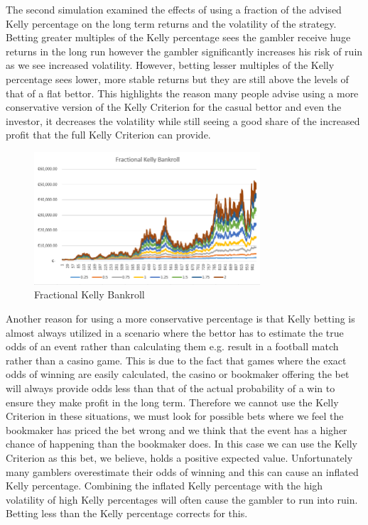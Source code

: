 \documentclass[12pt]{article}
\begin{document}
The second simulation examined the effects of using a fraction of the advised Kelly percentage on the long term returns and the volatility of the strategy. Betting greater multiples of the Kelly percentage sees the gambler receive huge returns in the long run however the gambler significantly increases his risk of ruin as we see increased volatility. However, betting lesser multiples of the Kelly percentage sees lower, more stable returns but they are still above the levels of that of a flat bettor. This highlights the reason many people advise using a more conservative version of the Kelly Criterion for the casual bettor and even the investor, it decreases the volatility while still seeing a good share of the increased profit that the full Kelly Criterion can provide.\cite{thorp}

\begin{figure}[H]
\centering
\includegraphics[width=0.75\textwidth]{frac_kelly.PNG}
\caption{Fractional Kelly Bankroll}
\end{figure}

Another reason for using a more conservative percentage is that Kelly betting is almost always utilized in a scenario where the bettor has to estimate the true odds of an event rather than calculating them e.g. result in a football match rather than a casino game. This is due to the fact that games where the exact odds of winning are easily calculated, the casino or bookmaker offering the bet will always provide odds less than that of the actual probability of a win to ensure they make profit in the long term. Therefore we cannot use the Kelly Criterion in these situations, we must look for possible bets where we feel the bookmaker has priced the bet wrong and we think that the event has a higher chance of happening than the bookmaker does. In this case we can use the Kelly Criterion as this bet, we believe, holds a positive expected value. Unfortunately many gamblers overestimate their odds of winning\cite{thorp} and this can cause an inflated Kelly percentage. Combining the inflated Kelly percentage with the high volatility of high Kelly percentages will often cause the gambler to run into ruin. Betting less than the Kelly percentage corrects for this.
\end{document}

